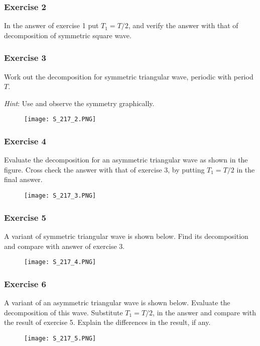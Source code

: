                 
\subsubsection{Exercise 2}
\noindent
In the answer of exercise 1 put $T_1 =T/2$, and verify the answer with that of decomposition of symmetric square wave.

\subsubsection{Exercise 3}
\noindent
Work out the decomposition for symmetric triangular wave, periodic with period $T$.

\noindent
\textit{Hint}: Use and observe the symmetry graphically.
\begin{figure}[ht]
\centering
\texttt{[image: S\_217\_2.PNG]}
\end{figure}


\subsubsection{Exercise 4}
\noindent
Evaluate the decomposition for an asymmetric triangular wave as shown in the figure. Cross check the answer with that of exercise 3, by putting  $T_1 = T/2$ in the final answer.
\begin{figure}[ht]
\centering
\texttt{[image: S\_217\_3.PNG]}
\end{figure}


\subsubsection{Exercise 5}
\noindent
A variant of symmetric triangular wave is shown below. Find its decomposition and compare with answer of exercise 3.
\begin{figure}[h!]
\centering
\texttt{[image: S\_217\_4.PNG]}
\end{figure}

\pagebreak

\subsubsection{Exercise 6}
\noindent
A variant of an asymmetric triangular wave is shown below. Evaluate the decomposition of  this wave. Substitute $T_1 = T/2$, in the answer and compare with the result of exercise 5. Explain the differences in the result, if any.
\begin{figure}[h!]
\centering
\texttt{[image: S\_217\_5.PNG]}
\end{figure}








                



                     
